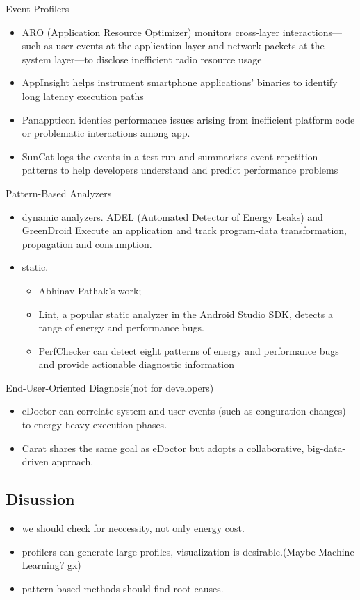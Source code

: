 \documentclass{article}
\begin{document}
Event Profilers
\begin{itemize}
\item ARO (Application Resource Optimizer) monitors cross-layer
  interactions—such as user events at the application layer and network packets
  at the system layer—to disclose inefficient radio resource usage
\item AppInsight helps instrument smartphone applications’ binaries to identify
  long latency execution paths
\item Panappticon identies performance issues arising from inefficient platform
  code or problematic interactions among app.
\item SunCat logs the events in a test run and summarizes event repetition
  patterns to help developers understand and predict performance problems
\end{itemize}

Pattern-Based Analyzers
\begin{itemize}
\item dynamic analyzers. ADEL (Automated Detector of Energy Leaks) and
  GreenDroid Execute an application and track program-data transformation,
  propagation and consumption.
\item static.
  \begin{itemize}
  \item 
    Abhinav Pathak's work;
  \item Lint, a popular static analyzer in the Android Studio SDK, detects a
    range of energy and performance bugs.
  \item PerfChecker can detect eight patterns of energy and performance bugs and
    provide actionable diagnostic information
  \end{itemize}
\end{itemize}

End-User-Oriented Diagnosis(not for developers)
\begin{itemize}
\item eDoctor can correlate system and user events (such as conguration changes)
  to energy-heavy execution phases.
\item Carat shares the same goal as eDoctor but adopts a collaborative,
  big-data-driven approach.
\end{itemize}

\subsection{Disussion}
\begin{itemize}
\item we should check for neccessity, not only energy cost.
\item profilers can generate large profiles, visualization is desirable.(Maybe
  Machine Learning? gx)
\item pattern based methods should find root causes.
\end{itemize}
\end{document}
